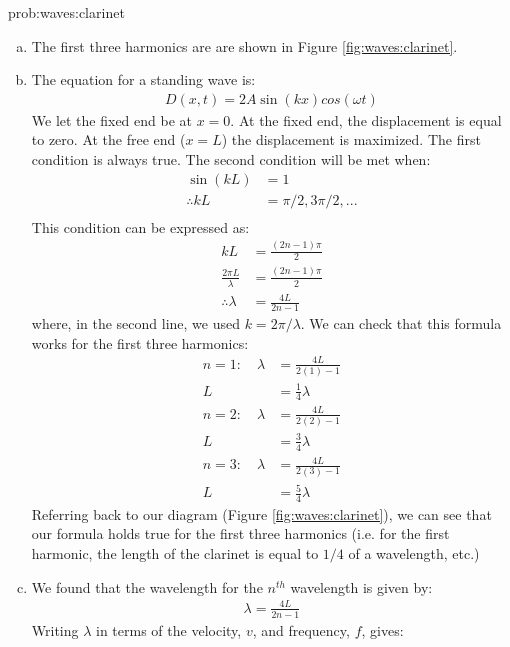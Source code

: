 \begin{solution}{prob:waves:clarinet}\label{soln:waves:clarinet}
\begin{enumerate}[(a)]
\item The first three harmonics are are shown in Figure \ref {fig:waves:clarinet}.
\item The equation for a standing wave is:
\begin{align*}
D(x,t)=2A\sin(kx)cos(\omega t)
\end{align*}
We let the fixed end be at $x=0$. At the fixed end, the displacement is equal to zero. At the free end ($x=L$) the displacement is maximized. The first condition is always true. The second condition will be met when:
\begin{align*}
\sin(kL)&=1\\
\therefore kL&=\pi/2,3\pi/2,...\\
\end{align*}
This condition can be expressed as:
\begin{align*}
kL&=\frac{(2n-1)\pi}{2}\\
\frac{2\pi L}{\lambda}&=\frac{(2n-1)\pi}{2}\\
\therefore \lambda&=\frac{4L}{2n-1}
\end{align*}
where, in the second line, we used $k=2\pi /\lambda$. We can check that this formula works for the first three harmonics:
\begin{align*}
n=1: \quad \lambda&=\frac{4L}{2(1)-1} \\
L&=\frac{1}{4}\lambda \\
n=2: \quad \lambda&=\frac{4L}{2(2)-1} \\
L&= \frac{3}{4}\lambda \\
n=3: \quad \lambda&=\frac{4L}{2(3)-1} \\
L&= \frac{5}{4}\lambda 
\end{align*}
Referring back to our diagram (Figure \ref{fig:waves:clarinet}), we can see that our formula holds true for the first three harmonics (i.e. for the first harmonic, the length of the clarinet is equal to $1/4$ of a wavelength, etc.)
\item We found that the wavelength for the $n^{th}$ wavelength is given by: 
\begin{align*}
\lambda=\frac{4L}{2n-1}
\end{align*}
Writing $\lambda$ in terms of the velocity, $v$, and frequency, $f$, gives:

\end{enumerate}
\end{solution}
